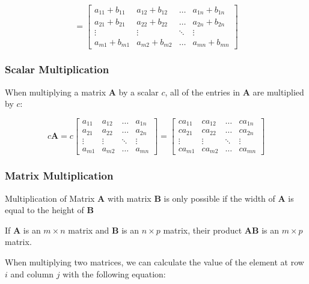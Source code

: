 \documentclass[11pt]{article}
\begin{document}
\[= \begin{bmatrix}
a_{11}+b_{11} & a_{12}+b_{12}  & \dots  & a_{1n}+b_{1n}\\ 
a_{21}+b_{21} & a_{22}+b_{22}  & \dots & a_{2n}+b_{2n} \\ 
\vdots & \vdots  & \ddots  & \vdots \\ 
a_{m1}+b_{m1} & a_{m2}+b_{m2}  &  \dots & a_{mn}+b_{mn}
\end{bmatrix}\]

\hypertarget{scalar-multiplication}{%
\subsubsection{Scalar Multiplication}\label{scalar-multiplication}}

When multiplying a matrix \(\mathbf{A}\) by a scalar \(c\), all of the
entries in \(\mathbf{A}\) are multiplied by \(c\):

\[c\mathbf{A} = c \begin{bmatrix}a_{11} & a_{12}  & \dots  & a_{1n}\\ 
a_{21} & a_{22}  & \dots &a_{2n} \\ 
\vdots & \vdots & \ddots  & \vdots \\ 
a_{m1} & a_{m2}  & \dots  & a_{mn}
\end{bmatrix} = \begin{bmatrix} ca_{11} & ca_{12}  & \dots  & ca_{1n}\\ 
ca_{21} & ca_{22}  & \dots &ca_{2n} \\ 
\vdots & \vdots & \ddots  & \vdots \\ 
ca_{m1} & ca_{m2}  & \dots  & ca_{mn}\end{bmatrix}\]

\hypertarget{matrix-multiplication}{%
\subsubsection{Matrix Multiplication}\label{matrix-multiplication}}

Multiplication of Matrix \(\mathbf{A}\) with matrix \(\mathbf{B}\) is
only possible if the width of \(\mathbf{A}\) is equal to the height of
\(\mathbf{B}\)

If \(\mathbf{A}\) is an \(m \times n\) matrix and \(\mathbf{B}\) is an
\(n \times p\) matrix, their product \(\mathbf{AB}\) is an
\(m \times p\) matrix.

When multiplying two matrices, we can calculate the value of the element
at row \(i\) and column \(j\) with the following equation:
\end{document}
